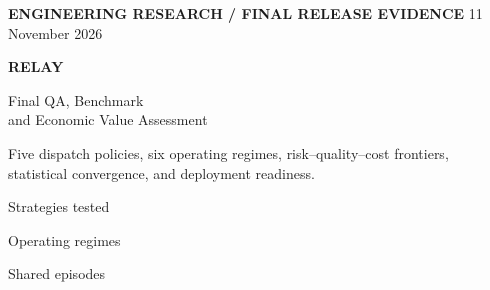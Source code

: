 \documentclass[10pt,a4paper]{article}
\begin{document}
\vspace*{9mm}
{\sffamily\small\bfseries\color{sage} ENGINEERING RESEARCH / FINAL RELEASE EVIDENCE }\hfill {\sffamily\small\color{muted} 11 November 2026}\par\vspace{6mm}
{\sffamily\fontsize{30}{34}\selectfont\bfseries RELAY}\par\vspace{1mm}
{\sffamily\fontsize{20}{25}\selectfont Final QA, Benchmark\\and Economic Value Assessment}\par\vspace{4mm}
{\large\color{muted} Five dispatch policies, six operating regimes, risk--quality--cost frontiers, statistical convergence, and deployment readiness.}\par\vspace{9mm}
\par
\begin{minipage}[t]{0.245\linewidth}
\begin{tcolorbox}[colback=white,colframe=line,arc=2mm,boxrule=.4pt,height=29mm]
{\footnotesize\color{muted} Strategies tested}\par\vspace{2mm}{\LARGE\bfseries 5}\par\vspace{1mm}{\scriptsize FCFS to RELAY hybrids}
\end{tcolorbox}
\end{minipage}\hfill
\begin{minipage}[t]{0.245\linewidth}
\begin{tcolorbox}[colback=white,colframe=line,arc=2mm,boxrule=.4pt,height=29mm]
{\footnotesize\color{muted} Operating regimes}\par\vspace{2mm}{\LARGE\bfseries 6}\par\vspace{1mm}{\scriptsize Paired synthetic trials}
\end{tcolorbox}
\end{minipage}\hfill
\begin{minipage}[t]{0.245\linewidth}
\begin{tcolorbox}[colback=white,colframe=line,arc=2mm,boxrule=.4pt,height=29mm]
{\footnotesize\color{muted} Shared episodes}\par\vspace{2mm}{\LARGE\bfseries 3,000}\par\vspace{1mm}{\scriptsize Holdout seed 9099}
\end{tcolorbox}
\end{minipage}\hfill
\end{document}

